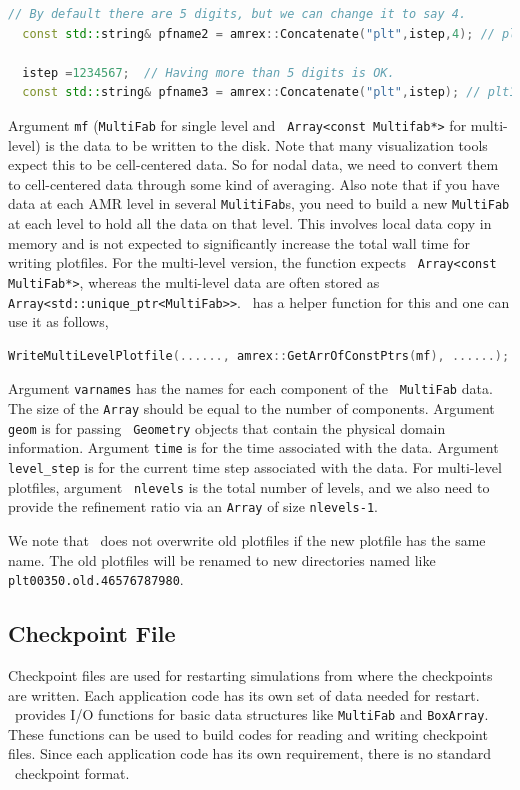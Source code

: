 {{\begin{lstlisting}[language=cpp]
  // By default there are 5 digits, but we can change it to say 4.
  const std::string& pfname2 = amrex::Concatenate("plt",istep,4); // plt0258  

  istep =1234567;  // Having more than 5 digits is OK.
  const std::string& pfname3 = amrex::Concatenate("plt",istep); // plt12344567
\end{lstlisting}
Argument {\tt mf} ({\tt MultiFab} for single level and {\tt
  Array<const Multifab*>} for multi-level) is the data to be written
to the disk.  Note that many visualization tools expect this to be
cell-centered data.  So for nodal data, we need to convert them to
cell-centered data through some kind of averaging.  Also note that if
you have data at each AMR level in several {\tt MulitiFab}s, you need
to build a new {\tt MultiFab} at each level to hold all the data on
that level.  This involves local data copy in memory and is not
expected to significantly increase the total wall time for writing
plotfiles.  For the multi-level version, the function expects {\tt
  Array<const MultiFab*>}, whereas the multi-level data are often
stored as {\tt Array<std::unique\_ptr<MultiFab>>}.  \amrex\ has a
helper function for this and one can use it as follows,
\begin{lstlisting}[language=cpp]
   WriteMultiLevelPlotfile(......, amrex::GetArrOfConstPtrs(mf), ......);
\end{lstlisting}
Argument {\tt varnames} has the names for each component of the {\tt
MultiFab} data.  The size of the {\tt Array} should be equal to the
number of components.  Argument {\tt geom} is for passing {\tt
Geometry} objects that contain the physical domain
information. Argument {\tt time} is for the time associated with the
data.  Argument {\tt level\_step} is for the current time step
associated with the data.  For multi-level plotfiles, argument {\tt
nlevels} is the total number of levels, and we also need to provide
the refinement ratio via an {\tt Array} of size {\tt nlevels-1}.

We note that \amrex\ does not overwrite old plotfiles if the new
plotfile has the same name.  The old plotfiles will be renamed to
new directories named like {\tt plt00350.old.46576787980}.

\subsection{Checkpoint File}

Checkpoint files are used for restarting simulations from where the
checkpoints are written.  Each application code has its own set of
data needed for restart.  \amrex\ provides I/O functions for basic
data structures like {\tt MultiFab} and {\tt BoxArray}.  These
functions can be used to build codes for reading and writing
checkpoint files.  Since each application code has its own
requirement, there is no standard \amrex\ checkpoint format.

}}

